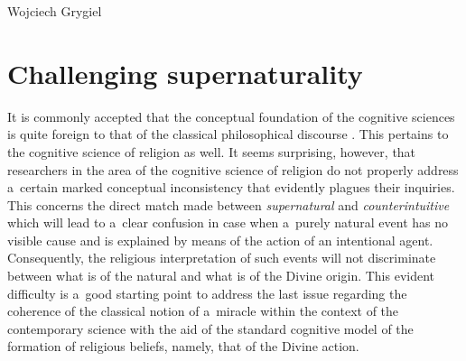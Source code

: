 \begin{artengenv}{Wojciech Grygiel}
\section*{Challenging supernaturality}
It is commonly accepted that the conceptual foundation of the cognitive sciences is quite foreign to that of the classical philosophical discourse
\parencites[e.g.][]{brozek_philosophy_2013}[][]{grygiel_metodologiczne_2011}. %
 This pertains to the cognitive science of religion as well. It seems surprising, however, that researchers in the area of the cognitive science of religion do not properly address a~certain marked conceptual inconsistency that evidently plagues their inquiries. This concerns the direct match made between \textit{supernatural} and \textit{counterintuitive} 
\parencite[e.g.][p.97]{barrett_cognitive_2011} %
 which will lead to a~clear confusion in case when a~purely natural event has no visible cause and is explained by means of the action of an intentional agent. Consequently, the religious interpretation of such events will not discriminate between what is of the natural and what is of the Divine origin. This evident difficulty is a~good starting point to address the last issue regarding the coherence of the classical notion of a~miracle within the context of the contemporary science with the aid of the standard cognitive model of the formation of religious beliefs, namely, that of the Divine action.


\end{artengenv}
